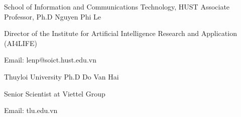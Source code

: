 

\begin{cventries}

  \cventry
    {School of Information and Communications Technology, HUST} %
    {Associate Professor, Ph.D Nguyen Phi Le} %
    {} %
    {} %
    {
      \begin{cvitems} %
        \item {Director of the Institute for Artificial Intelligence Research and Application (AI4LIFE)}
        \item {Email: lenp@soict.hust.edu.vn}
      \end{cvitems}
    }

  \cventry
    {Thuyloi University} %
    {Ph.D Do Van Hai} %
    {} %
    {} %
    {
      \begin{cvitems} %
        \item {Senior Scientist at Viettel Group}
        \item {Email: tlu.edu.vn}
      \end{cvitems}
    }

\end{cventries}
